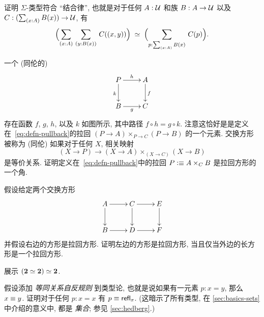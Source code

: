 \begin{ex}
    \label{ex:sigma-assoc}
    证明 $\Sigma$-类型符合 ``结合律'',
    也就是对于任何 $A:\mathcal{U}$ 和族 $B:A\to\mathcal{U}$ 以及 $C:(\sm{x:A} B(x))\to\UU$, 有
    \[\eqvspaced{\Parens{\sm{x:A}{y:B(x)} C(\pairr{x,y})}}{\Parens{\sm{p:\sm{x:A}B(x)} C(p)}}. \]
\end{ex}

\begin{ex}
    \label{ex:pullback}
    一个 (同伦的) 
    \begin{equation*}
        \vcenter{\xymatrix{
            P\ar[r]^h\ar[d]_k &
            A\ar[d]^f\\
            B\ar[r]_g &
            C
        }}
    \end{equation*}
    存在函数 $f$, $g$, $h$, 以及 $k$ 如图所示, 其中路径 $f \circ h= g \circ k$.
    注意这恰好是是定义在~\eqref{eq:defn-pullback}的拉回 $(P\to A) \times_{P\to C} (P\to B)$ 的一个元素.
    交换方形被称为 (同伦) 
    如果对于任何 $X$, 相关映射
    \[ (X\to P) \to (X\to A) \times_{(X\to C)} (X\to B) \]
    是等价关系.
    证明定义在~\eqref{eq:defn-pullback}中的拉回 $P \vcentcolon\equiv A\times_C B$  是拉回方形的一个角.
\end{ex}

\begin{ex}
    \label{ex:pullback-pasting}
    假设给定两个交换方形
    \begin{equation*}
        \vcenter{\xymatrix{
            A\ar[r]\ar[d] &
            C\ar[r]\ar[d] &
            E\ar[d]\\
            B\ar[r] &
            D\ar[r] &
            F
        }}
    \end{equation*}
    并假设右边的方形是拉回方形.
    证明左边的方形是拉回方形, 当且仅当外边的长方形是一个拉回方形.
\end{ex}

\begin{ex}
    \label{ex:eqvboolbool}
    展示 $(\mathbf{2} \simeq \mathbf{2}) \simeq \mathbf{2}$.
\end{ex}

\begin{ex}
    \label{ex:equality-reflection}
    假设添加 \emph{等同关系自反规则} 到类型论, 也就是说如果有一元素 $p:x=y$, 那么 $x\equiv y$.
    证明对于任何 $p:x=x$ 有 $p\equiv \mathsf{refl}_{x}$.
    (这暗示了所有类型, 在 \cref{sec:basics-sets} 中介绍的意义中, 都是 \emph{集合}; 参见 \cref{sec:hedberg}.)
\end{ex}

